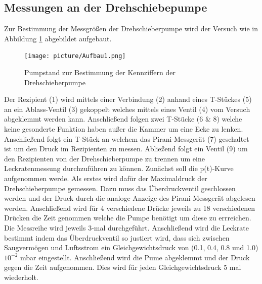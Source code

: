 \subsection{Messungen an der Drehschiebepumpe}
Zur Bestimmung der Messgrößen der Drehschieberpumpe wird der Versuch wie in Abbildung \ref{fig:Dreh} abgebildet aufgebaut. 
\begin{figure}[htpb]
  \centering
  \texttt{[image: picture/Aufbau1.png]}
  \caption{Pumpstand zur Bestimmung der Kennziffern der Drehschieberpumpe}
  \label{fig:Dreh}
\end{figure}
Der Rezipient (1) wird mittels einer Verbindung (2) anhand eines T-Stückes (5) an ein Ablass-Ventil (3) gekoppelt welches mittels eines Ventil (4) vom Versuch abgeklemmt werden kann. Anschließend folgen zwei T-Stücke (6 \& 8) welche keine gesonderte Funktion haben außer die Kammer um eine Ecke zu lenken. Anschließend folgt ein T-Stück an welchem das Pirani-Messgerät (7) geschaltet ist um den Druck im Rezipienten zu messen. Abließend folgt ein Ventil (9) um den Rezipienten von der Drehschieberpumpe zu trennen um eine Leckratenmessung durchzuführen zu können. \newline
Zunächst soll die p(t)-Kurve aufgenommen werde. Als erstes wird dafür der Maximaldruck der Drehschieberpumpe gemessen. Dazu muss das Überdruckventil geschlossen werden und der Druck durch die analoge Anzeige des Pirani-Messgerät abgelesen werden. Anschließend wird für 4 verschiedene Drücke jeweils zu 18 verschiedenen Drücken die Zeit genommen welche die Pumpe benötigt um diese zu errreichen. Die Messreihe wird jeweils 3-mal durchgeführt. \newline 
Anschließend wird die Leckrate bestimmt indem das Überdruckventil so justiert wird, dass sich zwischen Saugvermögen und Luftsstrom ein Gleichgewichtsdruck von (0.1, 0.4, 0.8 und 1.0) \cdot $10^{-2}$ mbar eingestellt. Anschließend wird die Pume abgeklemmt und der Druck gegen die Zeit aufgenommen. Dies wird für jeden Gleichgewichtsdruck 5 mal wiederholt.  \newline
